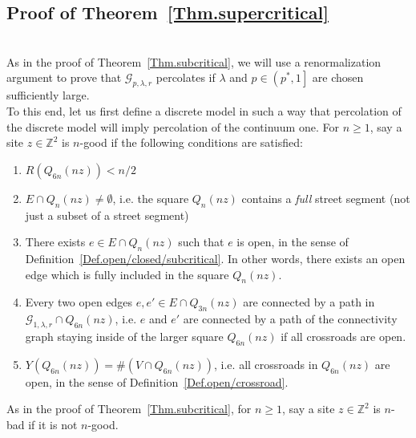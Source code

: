 \documentclass[10pt,a4paper]{amsart}
\theoremstyle{exampstyle}
\theoremstyle{exampnotations}
\begin{document}
\subsection{Proof of Theorem~\ref{Thm.supercritical}}\mbox{}\\
As in the proof of Theorem~\ref{Thm.subcritical}, we will use a renormalization argument to prove that $\mathcal{G}_{p,\lambda,r}$ percolates if $\lambda$ and $p \in \left(p^{*},1\right]$ are chosen sufficiently large. \\
To this end, let us first define a discrete model in such a way that percolation of the discrete model will imply percolation of the continuum one. For $n \geq 1$, say a site $z \in \mathbb{Z}^{2}$ is $n$-good if the following conditions are satisfied:
\begin{enumerate}
\item $R(Q_{6n}(nz)) < n/2$
\item $E \cap Q_n(nz) \neq \emptyset$, i.e. the square $Q_n(nz)$ contains a \emph{full} street segment (not just a subset of a street segment)
\item There exists $e \in E \cap Q_n(nz)$ such that $e$ is open, in the sense of Definition~\ref{Def.open/closed/subcritical}. In other words, there exists an open edge which is fully included in the square $Q_n(nz)$.
\item Every two open edges $e,e' \in E \cap Q_{3n}(nz)$ are connected by a path in $\mathcal{G}_{1,\lambda,r}\cap Q_{6n}(nz)$, i.e. $e$ and $e'$ are connected by a path of the connectivity graph staying inside of the larger square $Q_{6n}(nz)$ if all crossroads are open.
\item $Y(Q_{6n}(nz)) = \#(V \cap Q_{6n}(nz))$, i.e. all crossroads in $Q_{6n}(nz)$ are open, in the sense of Definition~\ref{Def.open/crossroad}.
\end{enumerate}
As in the proof of Theorem~\ref{Thm.subcritical}, for $n \geq 1$, say a site $z \in \mathbb{Z}^{2}$ is $n$-bad if it is not $n$-good. \\
\end{document}
